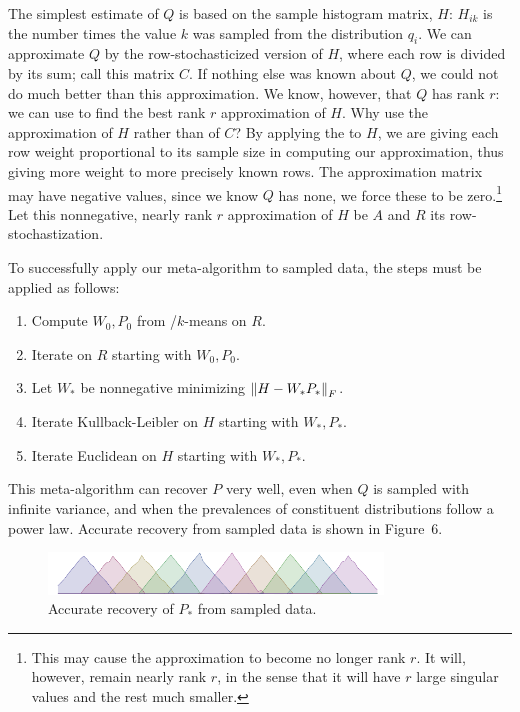 \documentclass[conference]{IEEEtran}
\begin{document}
The simplest estimate of $Q$ is based on the sample histogram matrix, $H$:
$H_{ik}$ is the number times the value $k$ was sampled from the distribution $q_i$.
We can approximate $Q$ by the row-stochasticized version of $H$, where each row is divided by its sum;
call this matrix $C$.
If nothing else was known about $Q$, we could not do much better than this approximation.
We know, however, that $Q$ has rank $r$:
we can use  to find the best rank $r$ approximation of $H$.
Why use the  approximation of $H$ rather than of $C$?
By applying the  to $H$, we are giving each row weight proportional to its sample size in computing our approximation, thus giving more weight to more precisely known rows.
The  approximation matrix may have negative values, since we know $Q$ has none, we force these to be zero.\footnote{This may cause the approximation to become no longer rank $r$. It will, however, remain nearly rank $r$, in the sense that it will have $r$ large singular values and the rest much smaller.}
Let this nonnegative, nearly rank $r$ approximation of $H$ be $A$ and $R$ its row-stochastization.

To successfully apply our meta-algorithm to sampled data, the steps must be applied as follows:
\begin{enumerate}
  \item Compute $W_0,P_0$ from /$k$-means on $R$.
  \item Iterate  on $R$ starting with $W_0,P_0$.
  \item Let $W_*$ be nonnegative minimizing ${\lVert H - W_* P_*\rVert}_F$. 
  \item Iterate Kullback-Leibler on $H$ starting with $W_*,P_*$.
  \item Iterate Euclidean on $H$ starting with $W_*,P_*$.
\end{enumerate}
This meta-algorithm can recover $P$ very well, even when $Q$ is sampled with infinite variance, and when the prevalences of constituent distributions follow a power law. Accurate recovery from sampled data is shown in Figure~6.

\begin{figure}[t]
\begin{center}
\includegraphics[width=3.5in]{synth/S_nmf}
\end{center}
\vspace{-0.7em}
\caption{Accurate recovery of $P_*$ from sampled data.}
\vspace{-1em}
\end{figure}
\end{document}
